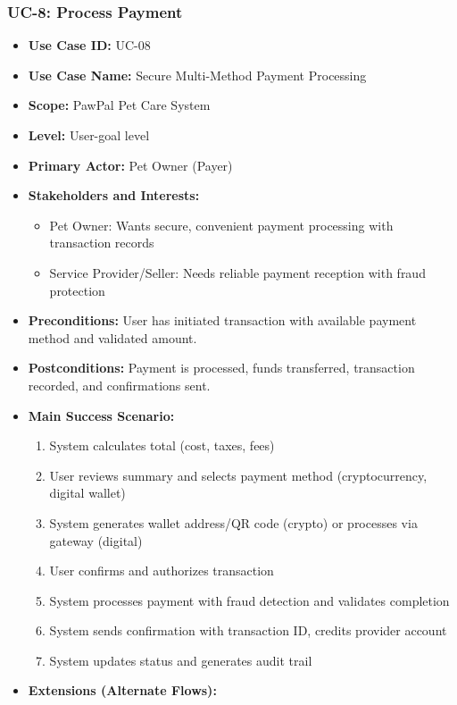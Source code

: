 \subsubsection*{UC-8: Process Payment}
\begin{itemize}
    \item \textbf{Use Case ID:} UC-08
    \item \textbf{Use Case Name:} Secure Multi-Method Payment Processing
    \item \textbf{Scope:} PawPal Pet Care System
    \item \textbf{Level:} User-goal level
    \item \textbf{Primary Actor:} Pet Owner (Payer)
    \item \textbf{Stakeholders and Interests:}
    \begin{itemize}
        \item Pet Owner: Wants secure, convenient payment processing with transaction records
        \item Service Provider/Seller: Needs reliable payment reception with fraud protection
    \end{itemize}
    \item \textbf{Preconditions:} User has initiated transaction with available payment method and validated amount.
    \item \textbf{Postconditions:} Payment is processed, funds transferred, transaction recorded, and confirmations sent.
    \item \textbf{Main Success Scenario:}
    \begin{enumerate}
        \item System calculates total (cost, taxes, fees)
        \item User reviews summary and selects payment method (cryptocurrency, digital wallet)
        \item System generates wallet address/QR code (crypto) or processes via gateway (digital)
        \item User confirms and authorizes transaction
        \item System processes payment with fraud detection and validates completion
        \item System sends confirmation with transaction ID, credits provider account
        \item System updates status and generates audit trail
    \end{enumerate}
    \item \textbf{Extensions (Alternate Flows):}

\end{itemize}
